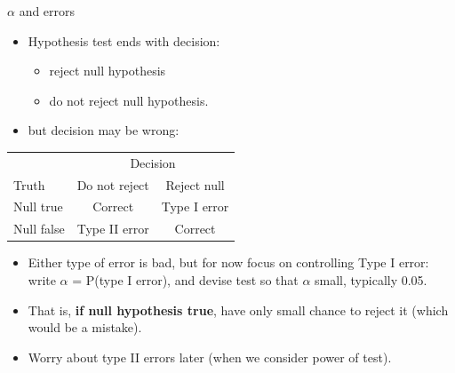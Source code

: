 \documentclass[ignorenonframetext,]{beamer}
\providecommand{\tightlist}{%
  \setlength{\itemsep}{0pt}\setlength{\parskip}{0pt}}
\begin{document}
\begin{frame}{\(\alpha\) and errors}
\protect\hypertarget{alpha-and-errors}{}

\begin{itemize}
\tightlist
\item
  Hypothesis test ends with decision:

  \begin{itemize}
  \tightlist
  \item
    reject null hypothesis
  \item
    do not reject null hypothesis.
  \end{itemize}
\item
  but decision may be wrong:
\end{itemize}

\begin{center}
  
  
\begin{tabular}{|l|cc|}
\hline
  & \multicolumn{2}{c|}{Decision}\\
Truth & Do not reject & Reject null\\
\hline
Null true & Correct & Type I error\\
Null false & Type II error & Correct\\
\hline
\end{tabular}
\end{center}

\begin{itemize}
\tightlist
\item
  Either type of error is bad, but for now focus on controlling Type I
  error: write \(\alpha\) = P(type I error), and devise test so that
  \(\alpha\) small, typically 0.05.
\item
  That is, \textbf{if null hypothesis true}, have only small chance to
  reject it (which would be a mistake).
\item
  Worry about type II errors later (when we consider power of test).
\end{itemize}

\end{frame}
\end{document}
